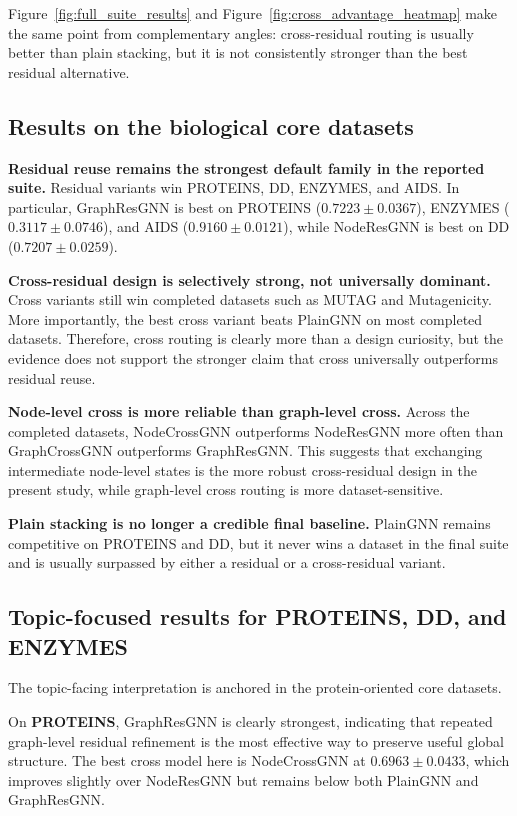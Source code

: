 Figure~\ref{fig:full_suite_results} and Figure~\ref{fig:cross_advantage_heatmap} make the same point from complementary angles: cross-residual routing is usually better than plain stacking, but it is not consistently stronger than the best residual alternative.

\subsection*{Results on the biological core datasets}

\textbf{Residual reuse remains the strongest default family in the reported suite.} Residual variants win PROTEINS, DD, ENZYMES, and AIDS. In particular, GraphResGNN is best on PROTEINS ($0.7223 \pm 0.0367$), ENZYMES ($0.3117 \pm 0.0746$), and AIDS ($0.9160 \pm 0.0121$), while NodeResGNN is best on DD ($0.7207 \pm 0.0259$).

\textbf{Cross-residual design is selectively strong, not universally dominant.} Cross variants still win completed datasets such as MUTAG and Mutagenicity. More importantly, the best cross variant beats PlainGNN on most completed datasets. Therefore, cross routing is clearly more than a design curiosity, but the evidence does not support the stronger claim that cross universally outperforms residual reuse.

\textbf{Node-level cross is more reliable than graph-level cross.} Across the completed datasets, NodeCrossGNN outperforms NodeResGNN more often than GraphCrossGNN outperforms GraphResGNN. This suggests that exchanging intermediate node-level states is the more robust cross-residual design in the present study, while graph-level cross routing is more dataset-sensitive.

\textbf{Plain stacking is no longer a credible final baseline.} PlainGNN remains competitive on PROTEINS and DD, but it never wins a dataset in the final suite and is usually surpassed by either a residual or a cross-residual variant.

\subsection*{Topic-focused results for PROTEINS, DD, and ENZYMES}

The topic-facing interpretation is anchored in the protein-oriented core datasets.

On \textbf{PROTEINS}, GraphResGNN is clearly strongest, indicating that repeated graph-level residual refinement is the most effective way to preserve useful global structure. The best cross model here is NodeCrossGNN at $0.6963 \pm 0.0433$, which improves slightly over NodeResGNN but remains below both PlainGNN and GraphResGNN.

